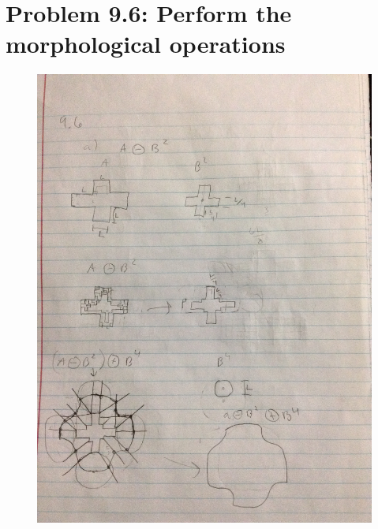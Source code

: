 \documentclass{article}
\begin{document}
	\section{Problem 9.6: Perform the morphological operations}
	\begin{figure}[H]
		\includegraphics[width=\linewidth]{9.6/fig1.JPG}
	\end{figure}
\end{document}
